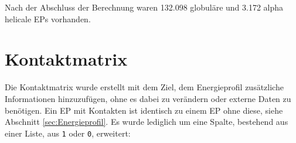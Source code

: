 Nach der Abschluss der Berechnung waren 132.098 globuläre und 3.172 alpha helicale \ac{EP}s vorhanden.

\section{Kontaktmatrix}
\label{sec:Kontaktmatrix}
Die Kontaktmatrix wurde erstellt mit dem Ziel, dem Energieprofil zusätzliche Informationen hinzuzufügen, ohne es dabei zu verändern oder externe Daten zu benötigen. Ein \ac{EP} mit Kontakten ist identisch zu einem \ac{EP} ohne diese, siehe Abschnitt \ref{sec:Energieprofil}. Es wurde lediglich um eine Spalte, bestehend aus einer Liste, aus \texttt{1} oder \texttt{0}, erweitert:

\begin{table}[H]
    \centering
    \caption{Dargestellt ist das gleiche \ac{EP} wie in Tabelle \ref{tab:EP}, mit zusätzlichem Kontaktprofil in jeder \texttt{ENGY} Zeile. Hierbei steht eine 1 für einen Kontakt und eine 0 für keinen Kontakt innerhalb der 8 Angström Sprähre, vgl. \ac{Abb} \ref{fig:8A_Sphaere}. Die Länge der Kontaktliste entspricht der Länge der Aminosäuresequenz, dem entsprechend ist die Position der Zahl, gleich der Position in der Kette.}
    \label{tab:kontaktmatrix}
\end{table}
